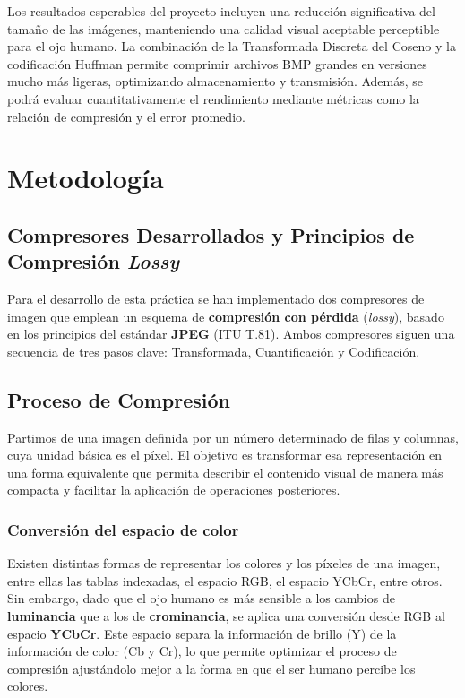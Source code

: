 \documentclass[a4paper, 12pt]{article}
\begin{document}
Los resultados esperables del proyecto incluyen una reducción significativa del tamaño de las imágenes, manteniendo una calidad visual aceptable perceptible para el ojo humano. La combinación de la Transformada Discreta del Coseno y la codificación Huffman permite comprimir archivos BMP grandes en versiones mucho más ligeras, optimizando almacenamiento y transmisión. Además, se podrá evaluar cuantitativamente el rendimiento mediante métricas como la relación de compresión y el error promedio.

\newpage
\section{Metodología}

\subsection{Compresores Desarrollados y Principios de Compresión \textit{Lossy}}

Para el desarrollo de esta práctica se han implementado dos compresores de imagen que emplean un esquema de \textbf{compresión con pérdida} (\textit{lossy}), basado en los principios del estándar \textbf{JPEG} (ITU T.81). Ambos compresores siguen una secuencia de tres pasos clave: Transformada, Cuantificación y Codificación.

\subsection{Proceso de Compresión}

Partimos de una imagen definida por un número determinado de filas y columnas, cuya unidad básica es el píxel. El objetivo es transformar esa representación en una forma equivalente que permita describir el contenido visual de manera más compacta y facilitar la aplicación de operaciones posteriores.

\subsubsection{Conversión del espacio de color}
Existen distintas formas de representar los colores y los píxeles de una imagen, entre ellas las tablas indexadas, el espacio RGB, el espacio YCbCr, entre otros. Sin embargo, dado que el ojo humano es más sensible a los cambios de \textbf{luminancia} que a los de \textbf{crominancia}, se aplica una conversión desde RGB al espacio \textbf{YCbCr}. Este espacio separa la información de brillo (Y) de la información de color (Cb y Cr), lo que permite optimizar el proceso de compresión ajustándolo mejor a la forma en que el ser humano percibe los colores.
\end{document}
